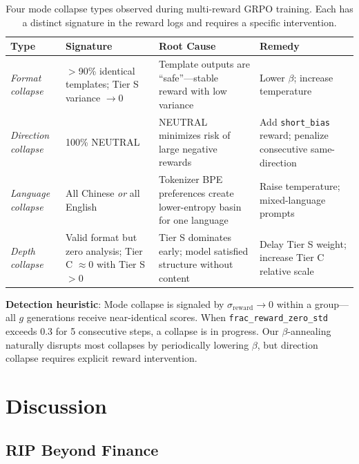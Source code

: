 \documentclass[sigconf]{acmart}
\begin{document}
\begin{table}[t]
\centering
\small
\caption{Four mode collapse types observed during multi-reward GRPO training. Each has a distinct signature in the reward logs and requires a specific intervention.}
\label{tab:collapse}
\begin{tabular}{@{}p{1.8cm}p{1.8cm}p{1.8cm}p{1.8cm}@{}}
\toprule
\textbf{Type} & \textbf{Signature} & \textbf{Root Cause} & \textbf{Remedy} \\
\midrule
\textit{Format collapse} & $>$90\% identical templates; Tier S variance $\to 0$ & Template outputs are ``safe''---stable reward with low variance & Lower $\beta$; increase temperature \\
\textit{Direction collapse} & 100\% NEUTRAL & NEUTRAL minimizes risk of large negative rewards & Add \texttt{short\_bias} reward; penalize consecutive same-direction \\
\textit{Language collapse} & All Chinese \textit{or} all English & Tokenizer BPE preferences create lower-entropy basin for one language & Raise temperature; mixed-language prompts \\
\textit{Depth collapse} & Valid format but zero analysis; Tier C $\approx 0$ with Tier S $> 0$ & Tier S dominates early; model satisfied structure without content & Delay Tier S weight; increase Tier C relative scale \\
\bottomrule
\end{tabular}
\end{table}

\textbf{Detection heuristic}: Mode collapse is signaled by $\sigma_{\text{reward}} \to 0$ within a group---all $g$ generations receive near-identical scores. When \texttt{frac\_reward\_zero\_std} exceeds 0.3 for 5 consecutive steps, a collapse is in progress. Our $\beta$-annealing naturally disrupts most collapses by periodically lowering $\beta$, but direction collapse requires explicit reward intervention.

\section{Discussion}
\label{sec:discussion}

\subsection{RIP Beyond Finance}
\end{document}
